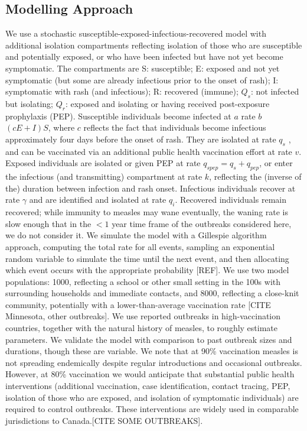 \documentclass[12pt,a4paper]{article}
\begin{document}
\subsection{Modelling Approach}
We use a stochastic susceptible-exposed-infectious-recovered model with additional isolation compartments reflecting isolation of those who are susceptible and potentially exposed, or who have been infected but have not yet become symptomatic. The compartments are S: susceptible; E: exposed and not yet symptomatic (but some are already infectious prior to the onset of rash); I: symptomatic with rash (and infectious); R: recovered (immune); $Q_s$: not infected but isolating; $Q_r$: exposed and isolating or having received post-exposure prophylaxis (PEP). Susceptible individuals become infected at $a$ rate $b$ $(cE + I) S$, where $c$ reflects the fact that individuals become infectious approximately four days before the onset of rash. They are isolated at rate $q_s$ , and can be vaccinated via an additional public health vaccination effort at rate $v$. Exposed individuals are isolated or given PEP at rate $q_{spep}  = q_s + q_{pep}$, or enter the infectious (and transmitting) compartment at rate $k$, reflecting the (inverse of the) duration between infection and rash onset. Infectious individuals recover at rate $\gamma$ and are identified and isolated at rate $q_i$. Recovered individuals remain recovered; while immunity to measles may wane eventually, the waning rate is slow enough that in the $<1$ year time frame of the outbreaks considered here, we do not consider it.  We simulate the model with a Gillespie algorithm approach, computing the total rate for all events, sampling an exponential random variable to simulate the time until the next event, and then allocating which event occurs with the appropriate probability [REF].
We use two model populations: 1000, reflecting a school or other small setting in the 100s with surrounding households and immediate contacts, and 8000, reflecting a close-knit community, potentially with a lower-than-average vaccination rate [CITE Minnesota, other outbreaks].
We use reported outbreaks in high-vaccination countries, together with the natural history of measles, to roughly estimate parameters. We validate the model with comparison to past outbreak sizes and durations, though these are variable. We note that at 90\% vaccination measles is not spreading endemically despite regular introductions and occasional outbreaks. However, at 80\% vaccination we would anticipate that substantial public health interventions (additional vaccination, case identification, contact tracing, PEP, isolation of those who are exposed, and isolation of symptomatic individuals) are required to control outbreaks. These interventions are widely used in comparable jurisdictions to Canada.[CITE SOME OUTBREAKS].
\end{document}
